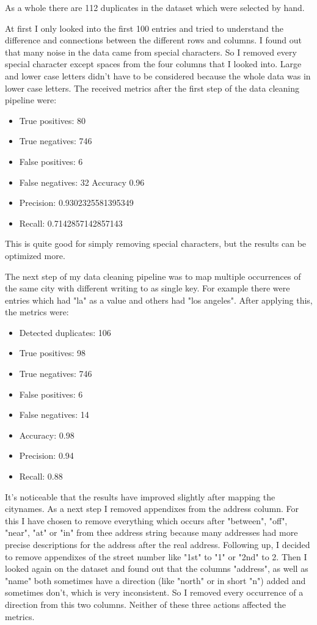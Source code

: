 \documentclass[conference]{IEEEtran}
\begin{document}
As a whole there are 112 duplicates in the dataset which were selected by hand.

At first I only looked into the first 100 entries and tried to understand the difference and connections between the different rows and columns. I found out that many noise in the data came from special characters. So I removed every special character except spaces from the four columns that I looked into. Large and lower case letters didn't have to be considered because the whole data was in lower case letters. The received metrics after the first step of the data cleaning pipeline were: 
\begin{itemize}
	\item True positives: 80
	\item True negatives: 746
    \item False positives: 6
	\item False negatives: 32
	Accuracy 0.96
    \item Precision: 0.9302325581395349
	\item Recall: 0.7142857142857143
\end{itemize}
This is quite good for simply removing special characters, but the results can be optimized more. 

The next step of my data cleaning pipeline was to map multiple occurrences of the same city with different writing to as single key. For example there were entries which had "la" as a value and others had "los angeles". After applying this, the metrics were: 
\begin{itemize}
	\item Detected duplicates: 106
	\item True positives: 98
	\item True negatives: 746
	\item False positives: 6
	\item False negatives: 14
	\item Accuracy: 0.98
	\item Precision: 0.94
	\item Recall: 0.88
\end{itemize}
It's noticeable that the results have improved slightly after mapping the citynames. As a next step I removed appendixes from the address column. For this I have chosen to remove everything which occurs after "between", "off", "near", "at" or "in" from thee address string because many addresses had more precise descriptions for the address after the real address. Following up, I decided to remove appendixes of the street number like "1st" to "1" or "2nd" to 2. Then I looked again on the dataset and found out that the columns "address", as well as "name" both sometimes have a direction (like "north" or in short "n") added and sometimes don't, which is very inconsistent. So I removed every occurrence of a direction from this two columns. Neither of these three actions affected the metrics. 
\end{document}
